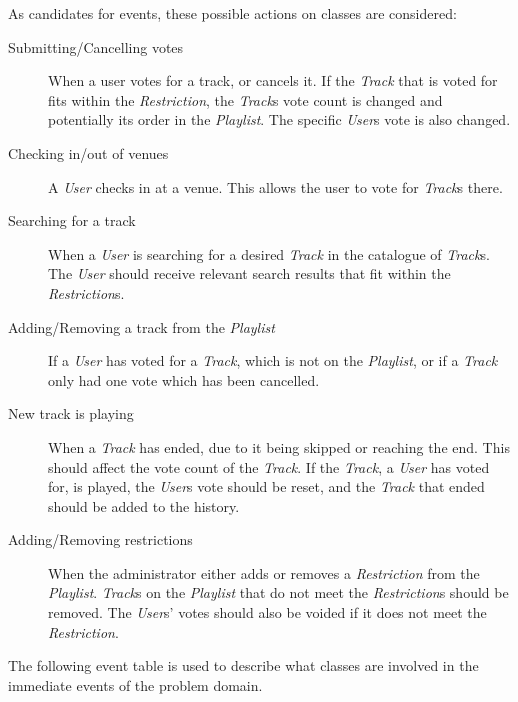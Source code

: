 As candidates for events, these possible actions on classes are considered:
\begin{description}

\item[Submitting/Cancelling votes]
    When a user votes for a track, or cancels it. If the \textit{Track} that is voted for fits within the \textit{Restriction}, the \textit{Track}s vote count is changed and potentially its order in the \textit{Playlist}. The specific \textit{User}s vote is also changed.

\item[Checking in/out of venues]
    A \textit{User} checks in at a venue. This allows the user to vote for \textit{Track}s there.

\item[Searching for a track]
    When a \textit{User} is searching for a desired \textit{Track} in the catalogue of \textit{Track}s. The \textit{User} should receive relevant search results that fit within the \textit{Restriction}s.

\item[Adding/Removing a track from the \textit{Playlist}]
    If a \textit{User} has voted for a \textit{Track}, which is not on the \textit{Playlist}, or if a \textit{Track} only had one vote which has been cancelled.

\item[New track is playing]
    When a \textit{Track} has ended, due to it being skipped or
    reaching the end. This should affect the vote count of the
    \textit{Track}. If the \textit{Track}, a \textit{User} has voted
    for, is played, the \textit{User}s vote should be reset, and the
    \textit{Track} that ended should be added to the history.

\item[Adding/Removing restrictions]
    When the administrator either adds or removes a \textit{Restriction} from the \textit{Playlist}. \textit{Track}s on the \textit{Playlist} that do not meet the \textit{Restriction}s should be removed. The \textit{User}s' votes should also be voided if it does not meet the \textit{Restriction}.

\end{description}

The following event table is used to describe what classes are involved in the immediate events of the problem domain.

